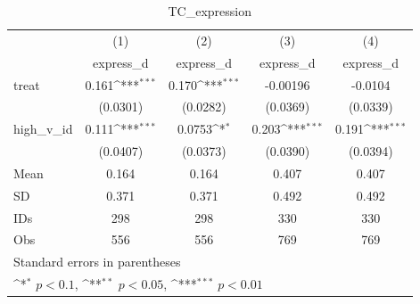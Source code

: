 \begin{table}[htbp]\centering
\def\sym#1{\ifmmode^{#1}\else\(^{#1}\)\fi}
\caption{TC\_expression}
\begin{tabular}{l*{4}{c}}
\hline\hline
                                &\multicolumn{1}{c}{(1)}&\multicolumn{1}{c}{(2)}&\multicolumn{1}{c}{(3)}&\multicolumn{1}{c}{(4)}\\
                                &\multicolumn{1}{c}{express\_d}&\multicolumn{1}{c}{express\_d}&\multicolumn{1}{c}{express\_d}&\multicolumn{1}{c}{express\_d}\\
\hline
treat                           &    0.161\sym{***}&    0.170\sym{***}& -0.00196         &  -0.0104         \\
                                & (0.0301)         & (0.0282)         & (0.0369)         & (0.0339)         \\
high\_v\_id                       &    0.111\sym{***}&   0.0753\sym{*}  &    0.203\sym{***}&    0.191\sym{***}\\
                                & (0.0407)         & (0.0373)         & (0.0390)         & (0.0394)         \\
\hline
Mean                            &    0.164         &    0.164         &    0.407         &    0.407         \\
SD                              &    0.371         &    0.371         &    0.492         &    0.492         \\
IDs                             &      298         &      298         &      330         &      330         \\
Obs                             &      556         &      556         &      769         &      769         \\
\hline\hline
\multicolumn{5}{l}{\footnotesize Standard errors in parentheses}\\
\multicolumn{5}{l}{\footnotesize \sym{*} \(p<0.1\), \sym{**} \(p<0.05\), \sym{***} \(p<0.01\)}\\
\end{tabular}
\end{table}
